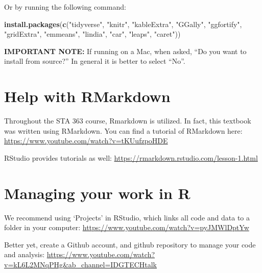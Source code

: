 \documentclass[
]{book}
\newenvironment{Shaded}{\begin{snugshade}}{\end{snugshade}}
\newcommand{\FunctionTok}[1]{\textcolor[rgb]{0.13,0.29,0.53}{\textbf{#1}}}
\newcommand{\NormalTok}[1]{#1}
\newcommand{\StringTok}[1]{\textcolor[rgb]{0.31,0.60,0.02}{#1}}
\begin{document}
Or by running the following command:

\begin{Shaded}
\begin{Highlighting}[]
\FunctionTok{install.packages}\NormalTok{(}\FunctionTok{c}\NormalTok{(}\StringTok{"tidyverse"}\NormalTok{,}
                   \StringTok{"knitr"}\NormalTok{,}
                   \StringTok{"kableExtra"}\NormalTok{,}
                   \StringTok{"GGally"}\NormalTok{,}
                   \StringTok{"ggfortify"}\NormalTok{,}
                   \StringTok{"gridExtra"}\NormalTok{,}
                   \StringTok{"emmeans"}\NormalTok{,}
                   \StringTok{"lindia"}\NormalTok{,}
                   \StringTok{"car"}\NormalTok{,}
                   \StringTok{"leaps"}\NormalTok{,}
                   \StringTok{"caret"}\NormalTok{))}
\end{Highlighting}
\end{Shaded}

\textbf{IMPORTANT NOTE:} If running on a Mac, when asked, ``Do you want to install from source?''
In general it is better to select ``No''.

\hypertarget{help-with-rmarkdown}{%
\section*{Help with RMarkdown}\label{help-with-rmarkdown}}

Throughout the STA 363 course, Rmarkdown is utilized.
In fact, this textbook was written using RMarkdown.
You can find a tutorial of RMarkdown here: \url{https://www.youtube.com/watch?v=tKUufzpoHDE}

RStudio provides tutorials as well: \url{https://rmarkdown.rstudio.com/lesson-1.html}

\hypertarget{managing-your-work-in-r}{%
\section*{Managing your work in R}\label{managing-your-work-in-r}}

We recommend using `Projects' in RStudio, which links all code and data to a folder in your computer: \url{https://www.youtube.com/watch?v=pyJMWlDptYw}

Better yet, create a Github account, and github repository to manage your code and analysis: \url{https://www.youtube.com/watch?v=kL6L2MNqPHg\&ab_channel=IDGTECHtalk}
\end{document}
